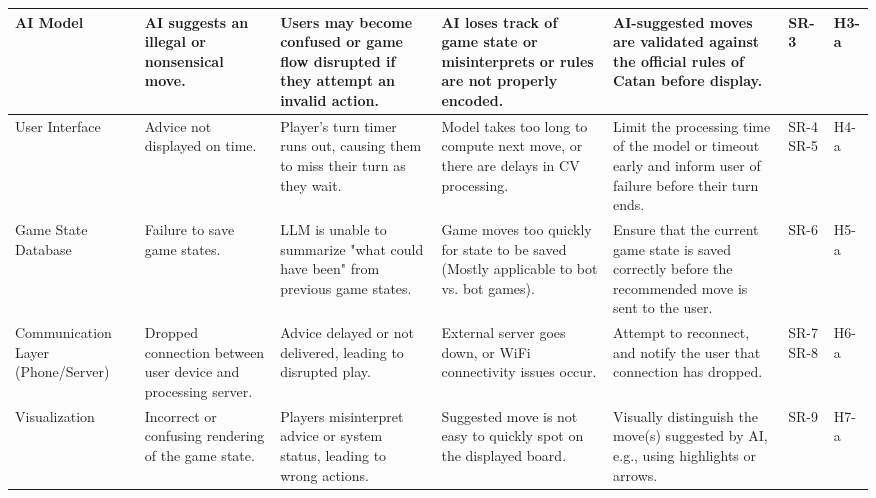 \documentclass{article}
\begin{document}
\begin{landscape}
\begin{tabularx}{\linewidth}{|P{2.5cm}|Y|Y|Y|Y|P{1cm}|P{1cm}|}
        \hline

        AI Model &
        AI suggests an illegal or nonsensical move. &
        Users may become confused or game flow disrupted if they attempt an invalid action. &
        AI loses track of game state or misinterprets or rules are not properly encoded. &
        AI-suggested moves are validated against the official rules of Catan before display. &
        SR-3 &
        H3-a \\

        \hline

        User Interface &
        Advice not displayed on time. &
        Player's turn timer runs out, causing them to miss their turn as they wait. &
        Model takes too long to compute next move, or there are delays in CV processing. &
        Limit the processing time of the model or timeout early and inform user of failure before their turn ends. &
        SR-4 \newline SR-5 &
        H4-a \\

        \hline

        Game State Database &
        Failure to save game states. &
        LLM is unable to summarize "what could have been" from previous game states. &
        Game moves too quickly for state to be saved (Mostly applicable to bot vs. bot games). &
        Ensure that the current game state is saved correctly before the recommended move is sent to the user. &
        SR-6 &
        H5-a \\

        \hline

        Communication Layer (Phone/Server) &
        Dropped connection between user device and processing server. &
        Advice delayed or not delivered, leading to disrupted play. &
        External server goes down, or WiFi connectivity issues occur. &
        Attempt to reconnect, and notify the user that connection has dropped. &
        SR-7 \newline SR-8 &
        H6-a \\

        \hline

        Visualization &
        Incorrect or confusing rendering of the game state. &
        Players misinterpret advice or system status, leading to wrong actions. &
        Suggested move is not easy to quickly spot on the displayed board. &
        Visually distinguish the move(s) suggested by AI, e.g., using highlights or arrows. &
        SR-9 &
        H7-a \\

    \end{tabularx}
\end{landscape}
\end{document}
